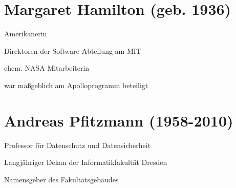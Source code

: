 \documentclass[a4paper,12pt]{scrreprt}
\begin{document}


\section*{Margaret Hamilton (geb. 1936)}
\begin{itemize*}
    \item Amerikanerin
    \item Direktoren der Software Abteilung am MIT
    \item ehem. NASA Mitarbeiterin
    \item war maßgeblich am Apolloprogramm beteiligt
\end{itemize*}

\section*{Andreas Pfitzmann (1958-2010)}
\begin{itemize*}
    \item Professor für Datenschutz und Datensicherheit
    \item Langjähriger Dekan der Informatikfakultät Dresden
    \item Namensgeber des Fakultätsgebäudes
\end{itemize*}

\pagebreak


\end{document}
